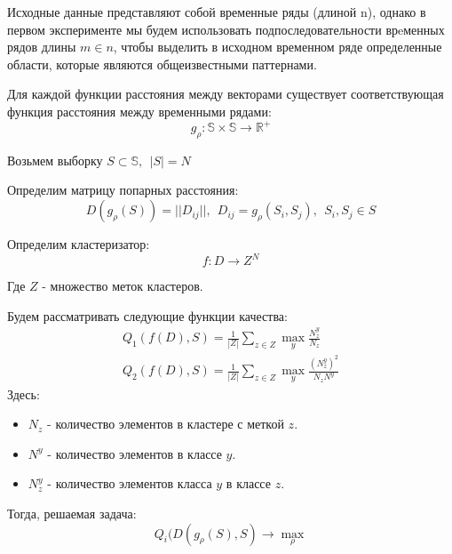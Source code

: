 \documentclass[12pt,twoside]{article}
\begin{document}
				Исходные данные представляют собой временные ряды (длиной n), однако в первом эксперименте мы будем использовать подпоследовательности врeменных рядов длины $m\in n$, чтобы выделить в исходном временном ряде определенные области, которые являются общеизвестными паттернами.

        Для каждой функции расстояния между векторами существует соответствующая функция расстояния между временными рядами:
        $$
            g_{\rho}: \mathbb{S} \times \mathbb{S} \rightarrow \mathbb{R}^+ 
        $$

        Возьмем выборку $ S \subset \mathbb{S}, \ \ |S| = N$

        Определим матрицу попарных расстояния:
        $$
            D(g_\rho(S)) = ||D_{ij}||, \ \ D_{ij} = g_\rho(S_i, S_j),\ \ S_i, S_j \in S 
        $$
        
        Определим кластеризатор:
        $$
            f: D \rightarrow Z^N
        $$

        Где $Z$ \-- множество меток кластеров.
				

        Будем рассматривать следующие функции качества:
        \begin{align*}
            Q_1(f(D), S) = \frac{1}{|Z|}\sum\limits_{z \in Z} \max_y \frac{N_z^y}{N_z}  \\
            Q_2(f(D), S) = \frac{1}{|Z|}\sum\limits_{z \in Z} \max_y \frac{(N_z^y)^2}{N_z N^y}
        \end{align*}
        Здесь: 
        \begin{itemize}[label=$\bullet$]
            \item $N_z$ \-- количество элементов в кластере с меткой $z$. 
            \item $N^y$ \-- количество элементов в классе $y$.
            \item $N_z^y$ \-- количество элементов класса $y$ в классе $z$.
        \end{itemize}

        Тогда, решаемая задача:
        $$
            Q_i(D(g_\rho(S), S) \rightarrow \max_{\rho}
        $$

                
\end{document}
